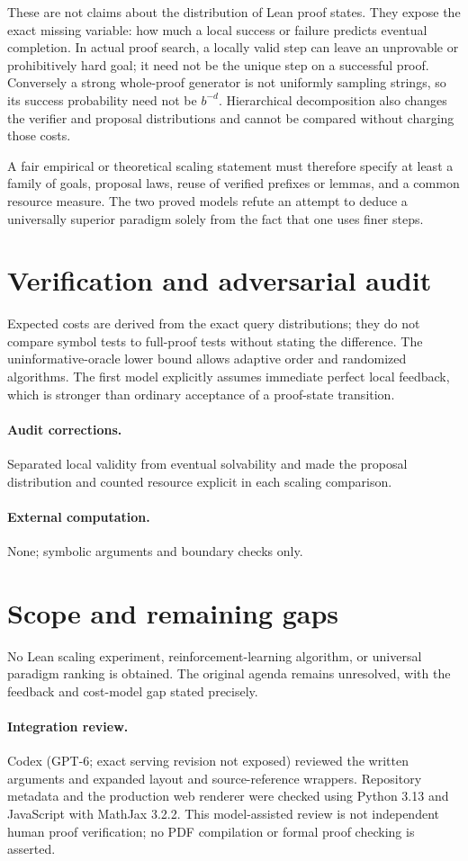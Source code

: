\documentclass[11pt]{article}
\begin{document}
These are not claims about the distribution of Lean proof states. They expose the exact missing variable: how much a local success or failure predicts eventual completion. In actual proof search, a locally valid step can leave an unprovable or prohibitively hard goal; it need not be the unique step on a successful proof. Conversely a strong whole-proof generator is not uniformly sampling strings, so its success probability need not be $b^{-d}$. Hierarchical decomposition also changes the verifier and proposal distributions and cannot be compared without charging those costs.

A fair empirical or theoretical scaling statement must therefore specify at least a family of goals, proposal laws, reuse of verified prefixes or lemmas, and a common resource measure. The two proved models refute an attempt to deduce a universally superior paradigm solely from the fact that one uses finer steps.
\section{Verification and adversarial audit}
Expected costs are derived from the exact query distributions; they do not compare symbol tests to full-proof tests without stating the difference. The uninformative-oracle lower bound allows adaptive order and randomized algorithms. The first model explicitly assumes immediate perfect local feedback, which is stronger than ordinary acceptance of a proof-state transition.
\paragraph{Audit corrections.} Separated local validity from eventual solvability and made the proposal distribution and counted resource explicit in each scaling comparison.
\paragraph{External computation.} None; symbolic arguments and boundary checks only.
\section{Scope and remaining gaps}
No Lean scaling experiment, reinforcement-learning algorithm, or universal paradigm ranking is obtained. The original agenda remains unresolved, with the feedback and cost-model gap stated precisely.
\paragraph{Integration review.} Codex (GPT-6; exact serving revision not exposed) reviewed the written arguments and expanded layout and source-reference wrappers. Repository metadata and the production web renderer were checked using Python 3.13 and JavaScript with MathJax 3.2.2. This model-assisted review is not independent human proof verification; no PDF compilation or formal proof checking is asserted.
\end{document}

